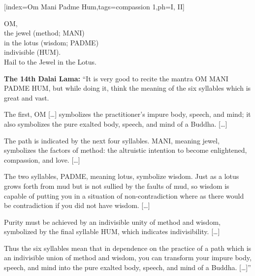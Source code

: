 [index={Om Mani Padme Hum},tags={compassion 1},ph={I, II}]
  {\small{} }
  \vspace{-2em}
  \begin{feeler}
    OM,\\
    the jewel (method; MANI)\\
    in the lotus (wisdom; PADME)\\
    indivisible (HUM).\\\vspace{1em}
    Hail to the Jewel in the Lotus.
  \end{feeler}
  \begin{explanation}
    \textbf{The 14th Dalai Lama:} ``It is very good to recite the mantra OM MANI PADME HUM, but
    while doing it, think the meaning of the six syllables which is great and vast.\par
    The first, OM [\ldots] symbolizes the practitioner's impure body, speech, and mind; it also
    symbolizes the pure exalted body, speech, and mind of a Buddha. [\ldots]\par
    The path is indicated by the next four syllables. MANI, meaning jewel, symbolizes the
    factors of method: the altruistic intention to become enlightened, compassion, and
    love. [\ldots]\par
    The two syllables, PADME, meaning lotus, symbolize wisdom. Just as a lotus grows forth
    from mud but is not sullied by the faults of mud, so wisdom is capable of putting you in
    a situation of non-contradiction where as there would be contradiction if you did not have
    wisdom. [\ldots]\par
    Purity must be achieved by an indivisible unity of method and wisdom, symbolized by the
    final syllable HUM, which indicates indivisibility. [\ldots]\par
    Thus the six syllables mean that in dependence on the practice of a path which is an
    indivisible union of method and wisdom, you can transform your impure body, speech, and
    mind into the pure exalted body, speech, and mind of a Buddha. [\ldots]''
  \end{explanation}
\endsong



